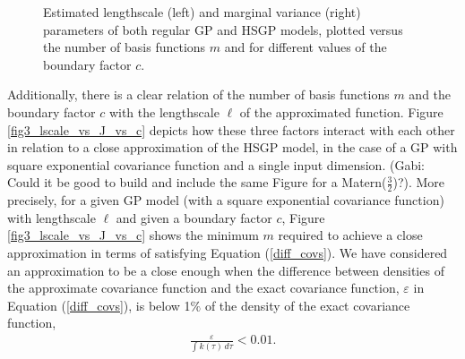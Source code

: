 \documentclass[]{interact}
\theoremstyle{plain}%
\theoremstyle{definition}
\theoremstyle{remark}
\begin{document}
\begin{figure}
\caption{Estimated lengthscale (left) and marginal variance (right) parameters of both regular GP and HSGP models, plotted versus the number of basis functions $m$ and for different values of the boundary factor $c$.}
  \label{fig6_lscale_vs_J}
\end{figure}


Additionally, there is a clear relation of the number of basis functions $m$ and the boundary factor $c$ with the lengthscale $\ell$ of the approximated function. Figure \ref{fig3_lscale_vs_J_vs_c} depicts how these three factors interact with each other in relation to 
a close approximation of the HSGP model, in the case of a GP with square exponential covariance function and a single input dimension. (Gabi: Could it be good to build and include the same Figure for a Matern($\frac{3}{2}$)?). More precisely, for a given GP model (with a square exponential covariance function) with lengthscale $\ell$ and given a boundary factor $c$, Figure \ref{fig3_lscale_vs_J_vs_c} shows the minimum $m$ required to achieve a close approximation in terms of satisfying Equation (\ref{diff_covs}). We have considered an approximation to be a close enough when the difference between densities of the approximate covariance function and the exact covariance function, $\varepsilon$ in Equation (\ref{diff_covs}), is below 1$\%$ of the density of the exact covariance function,
%
\begin{eqnarray*}
 \frac{\varepsilon}{\int k(\tau) \, d\tau} < 0.01.
\end{eqnarray*}
\end{document}
